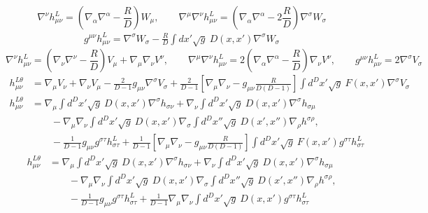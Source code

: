 \documentclass[10pt,letterpaper]{article}
\begin{document}
\begin{equation}
\nabla^\nu h_{\mu\nu}^L = \left(\nabla_\alpha \nabla^\alpha - \frac{R}{D}\right)W_\mu,
\qquad \nabla^\mu \nabla^\nu h_{\mu\nu}^L = \left(\nabla_\alpha \nabla^\alpha - 2\frac{R}{D}\right)\nabla^\sigma W_\sigma
\end{equation}
\begin{align}
g^{\mu\nu}h_{\mu\nu}^L = \nabla^\sigma W_{\sigma} - \frac{R}{D} \int dx' \sqrt{g}\ D(x,x') \nabla^\sigma W_\sigma
\end{align}
\begin{equation}
\nabla^\nu h_{\mu\nu}^L =  \left(\nabla_\nu\nabla^\nu - \frac{R}{D}\right)V_\mu + \nabla_\mu \nabla_\nu V^\nu,
\qquad \nabla^\mu \nabla^\nu h_{\mu\nu}^L = 2\left(\nabla_\alpha \nabla^\alpha - \frac{R}{D}\right)\nabla_\nu V^\nu,
\qquad g^{\mu\nu}h_{\mu\nu}^L = 2 \nabla^\sigma V_\sigma
\end{equation}
\begin{align}
h_{\mu\nu}^{L\theta} &= \nabla_\mu V_\nu +\nabla_\nu V_\mu - \frac{2}{D-1} g_{\mu\nu} \nabla^\sigma V_\sigma +\frac{2}{D-1}
\left[ \nabla_\mu\nabla_\nu- g_{\mu\nu}\frac{R}{D(D-1)}\right] \int d^Dx' \sqrt{g}\ F(x,x')\nabla^\sigma V_\sigma
\end{align}
\begin{align}
h_{\mu\nu}^{L\theta} &=  \nabla_\mu \int d^Dx' \sqrt{g}\ D(x,x')\nabla^\sigma h_{\sigma\nu} + \nabla_\nu \int d^Dx' \sqrt{g}\  D(x,x')\nabla^\sigma h_{\sigma\mu} 
\\
&\qquad -  
 \nabla_\mu\nabla_\nu \int d^Dx'\sqrt{g}\  D(x,x') \nabla_\sigma \int d^Dx'' \sqrt{g}\ D(x',x'')\nabla_\rho h^{\sigma\rho},
\nonumber\\
&\qquad - \frac{1}{D-1} g_{\mu\nu} g^{\sigma\tau}h^L_{\sigma\tau} +\frac{1}{D-1}
\left[ \nabla_\mu\nabla_\nu- g_{\mu\nu}\frac{R}{D(D-1)}\right] \int d^Dx' \sqrt{g}\ F(x,x')g^{\sigma\tau}h_{\sigma\tau}^L 
\end{align}
\begin{align}
h_{\mu\nu}^{L\theta} &=  \nabla_\mu \int d^Dx' \sqrt{g}\ D(x,x')\nabla^\sigma h_{\sigma\nu} + \nabla_\nu \int d^Dx' \sqrt{g}\  D(x,x')\nabla^\sigma h_{\sigma\mu} 
\\
&\qquad -  
 \nabla_\mu\nabla_\nu \int d^Dx'\sqrt{g}\  D(x,x') \nabla_\sigma \int d^Dx'' \sqrt{g}\ D(x',x'')\nabla_\rho h^{\sigma\rho},
\nonumber\\
&\qquad - \frac{1}{D-1} g_{\mu\nu} g^{\sigma\tau}h^L_{\sigma\tau} +\frac{1}{D-1}
 \nabla_\mu\nabla_\nu  \int d^Dx' \sqrt{g}\ D(x,x')g^{\sigma\tau}h_{\sigma\tau}^L 
\end{align}
\end{document}
